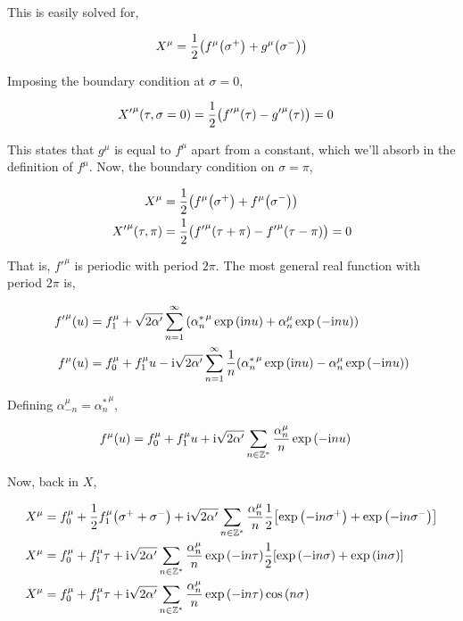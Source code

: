 This is easily solved for,

\begin{align*}
    X^\mu=\frac12\qty(f^\mu\qty(\sigma^+)+g^\mu\qty(\sigma^-))
\end{align*}

Imposing the boundary condition at $\sigma=0$,

\begin{align*}
    {X'}^\mu\qty(\tau,\sigma=0)&=\frac12\qty({f'}^\mu\qty(\tau)-{g'}^\mu\qty(\tau))=0
\end{align*}

This states that $g^\mu$ is equal to $f^\mu$ apart from a constant, which we'll absorb in the definition of $f^\mu$. Now, the boundary condition 
on $\sigma=\pi$,

\begin{align*}
    X^\mu&=\frac12\qty(f^\mu\qty(\sigma^+)+f^\mu\qty(\sigma^-))\\
    {X'}^\mu\qty(\tau,\pi)&=\frac12\qty({f'}^\mu\qty(\tau+\pi)-{f'}^\mu\qty(\tau-\pi))=0
\end{align*}

That is, ${f'}^\mu$ is periodic with period $2\pi$. The most general real function with period $2\pi$ is,

\begin{align*}
    {f'}^\mu\qty(u)&=f_1^\mu+\sqrt{2\alpha'}\sum\limits_{n=1}^\infty\qty({\alpha^\ast_n}^\mu\exp\qty(\textnormal{i} n u)+\alpha_n^\mu\exp\qty(-\textnormal{i} n u))\\
    f^\mu\qty(u)&=f_0^\mu+f_1^\mu u-\textnormal{i}\sqrt{2\alpha'}\sum\limits_{n=1}^\infty\frac1n\qty({\alpha^\ast_n}^\mu\exp\qty(\textnormal{i} n u)-\alpha_n^\mu\exp\qty(-\textnormal{i} n u))
\end{align*}

Defining $\alpha_{-n}^\mu={\alpha^\ast_n}^\mu$,

\begin{align*}
    f^\mu\qty(u)&=f_0^\mu+f_1^\mu u+\textnormal{i}\sqrt{2\alpha'}\sum\limits_{n\in\mathbb Z^\ast}\frac{\alpha_n^\mu}{n}\exp\qty(-\textnormal{i} n u)
\end{align*}

Now, back in $X$,

\begin{align*}
    X^\mu&=f_0^\mu+\frac12f_1^\mu\qty(\sigma^++\sigma^-)+\textnormal{i}\sqrt{2\alpha'}\sum\limits_{n\in\mathbb Z^\ast}\frac{\alpha_n^\mu}{n}\frac12\qty[\exp\qty(-\textnormal{i} n \sigma^+)+\exp\qty(-\textnormal{i} n\sigma^-)]\\
    X^\mu&=f_0^\mu+f_1^\mu\tau+\textnormal{i}\sqrt{2\alpha'}\sum\limits_{n\in\mathbb Z^\ast}\frac{\alpha_n^\mu}{n}\exp\qty(-\textnormal{i} n\tau)\frac12\qty[\exp\qty(-\textnormal{i} n \sigma)+\exp\qty(\textnormal{i} n\sigma)]\\
    X^\mu&=f_0^\mu+f_1^\mu\tau+\textnormal{i}\sqrt{2\alpha'}\sum\limits_{n\in\mathbb Z^\ast}\frac{\alpha_n^\mu}{n}\exp\qty(-\textnormal{i} n\tau)\cos\qty(n\sigma)   
\end{align*}

